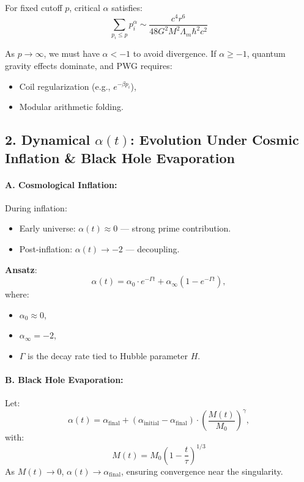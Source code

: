 \documentclass{article}
\theoremstyle{plain}
\theoremstyle{claimstyle}
\begin{document}
For fixed cutoff \( p \), critical \( \alpha \) satisfies:
\[
\sum_{p_i \leq p} p_i^\alpha \sim \frac{c^4 r^6}{48 G^2 M^2 \Lambda_m \hbar^2 c^2}
\]

As \( p \to \infty \), we must have \( \alpha < -1 \) to avoid divergence. If \( \alpha \geq -1 \), quantum gravity effects dominate, and PWG requires:
\begin{itemize}
    \item Coil regularization (e.g., \( e^{-\beta p_i} \)),
    \item Modular arithmetic folding.
\end{itemize}

\subsection*{2. Dynamical \(\alpha(t)\): Evolution Under Cosmic Inflation \& Black Hole Evaporation}

\paragraph*{A. Cosmological Inflation:}
During inflation:
\begin{itemize}
    \item Early universe: \( \alpha(t) \approx 0 \) — strong prime contribution.
    \item Post-inflation: \( \alpha(t) \to -2 \) — decoupling.
\end{itemize}

\textbf{Ansatz}:
\[
\alpha(t) = \alpha_0 \cdot e^{-\Gamma t} + \alpha_{\infty}(1 - e^{-\Gamma t}),
\]
where:
\begin{itemize}
    \item \( \alpha_0 \approx 0 \),
    \item \( \alpha_{\infty} = -2 \),
    \item \( \Gamma \) is the decay rate tied to Hubble parameter \( H \).
\end{itemize}

\paragraph*{B. Black Hole Evaporation:}
Let:
\[
\alpha(t) = \alpha_{\text{final}} + (\alpha_{\text{initial}} - \alpha_{\text{final}}) \cdot \left( \frac{M(t)}{M_0} \right)^\gamma,
\]
with:
\[
M(t) = M_0 \left(1 - \frac{t}{\tau} \right)^{1/3}
\]
As \( M(t) \to 0 \), \( \alpha(t) \to \alpha_{\text{final}} \), ensuring convergence near the singularity.
\end{document}
